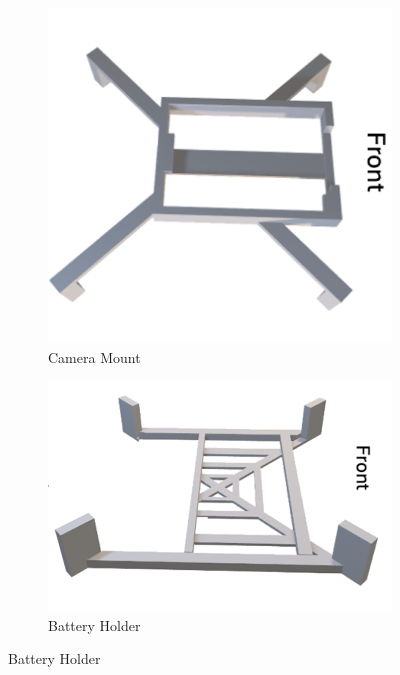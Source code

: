 \begin{figure}[H]
    \centering
    \begin{subfigure}[b]{0.4\textwidth}
        \centering
        \includegraphics[width=\textwidth]{img/assembly-4b.png}
        \caption{Camera Mount}
    \end{subfigure}
    \vspace{0.5cm}
    \begin{subfigure}[b]{0.45\textwidth}
        \centering
        \includegraphics[width=\textwidth]{img/assembly-9b.png}
        \caption{Battery Holder}

\end{subfigure}
\end{figure}
